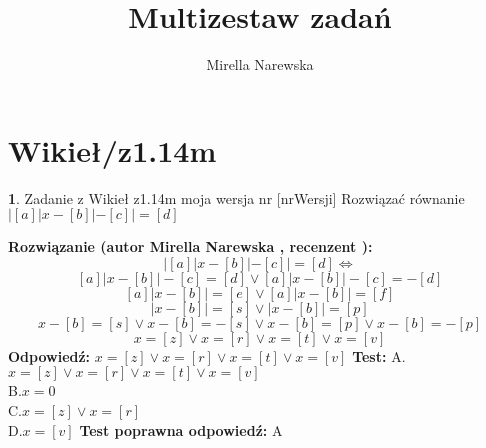 \documentclass[12pt, a4paper]{article}
\title{Multizestaw zadań}
\author{Mirella Narewska}
\date{}
\theoremstyle{definition} %
\newtheorem{zad}{}
\newcommand{\kategoria}[1]{\section{#1}} %
\newcommand{\zadStart}[1]{\begin{zad}#1\newline} %
\newcommand{\zadStop}{\end{zad}}   %
\newcommand{\rozwStart}[2]{\noindent \textbf{Rozwiązanie (autor #1 , recenzent #2): }\newline} %
\newcommand{\rozwStop}{\newline}                                            %
\newcommand{\odpStart}{\noindent \textbf{Odpowiedź:}\newline}    %
\newcommand{\odpStop}{\newline}                                             %
\newcommand{\testStart}{\noindent \textbf{Test:}\newline} %
\newcommand{\testStop}{\newline} %
\newcommand{\kluczStart}{\noindent \textbf{Test poprawna odpowiedź:}\newline} %
\newcommand{\kluczStop}{\newline} %
\begin{document}
\maketitle


\kategoria{Wikieł/z1.14m}
\zadStart{Zadanie z Wikieł z1.14m  moja wersja nr [nrWersji]}
Rozwiązać równanie $|[a]|x-[b]|-[c]|=[d]$
\zadStop
\rozwStart{Mirella Narewska}{}
$$|[a] |x-[b]|-[c]|=[d] \Leftrightarrow$$
$$[a]|x-[b]|-[c]=[d] \vee [a] |x-[b]|-[c]=-[d]$$
$$[a]|x-[b]|=[e] \vee [a]|x-[b]|=[f]$$
$$|x-[b]|=[s] \vee |x-[b]|=[p]$$
$$x-[b]=[s] \vee x-[b]=-[s] \vee x-[b]=[p] \vee x-[b]=-[p]$$
$$x=[z] \vee x=[r] \vee x=[t] \vee x=[v]$$
\rozwStop
\odpStart
$x=[z] \vee x=[r] \vee x=[t] \vee x=[v]$
\odpStop
\testStart
A.$x=[z] \vee x=[r] \vee x=[t] \vee x=[v]$
\\
B.$x=0$
\\
C.$x=[z] \vee x=[r]$
\\
D.$x=[v]$
\testStop
\kluczStart
A
\kluczStop
\end{document}
